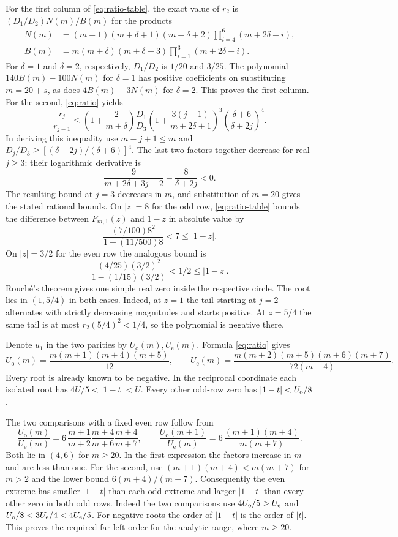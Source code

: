 \documentclass[11pt]{article}
\begin{document}
For the first column of \eqref{eq:ratio-table}, the exact value of $r_2$ is $(D_1/D_2)N(m)/B(m)$ for the products
\[
\begin{aligned}
N(m)&=(m-1)(m+\delta+1)(m+\delta+2)
                \prod_{i=4}^6(m+2\delta+i),\\
B(m)&=m(m+\delta)(m+\delta+3)\prod_{i=1}^3(m+2\delta+i).
\end{aligned}
\]
For $\delta=1$ and $\delta=2$, respectively, $D_1/D_2$ is $1/20$ and $3/25$. The polynomial $140B(m)-100N(m)$ for $\delta=1$ has positive coefficients on substituting $m=20+s$, as does $4B(m)-3N(m)$ for $\delta=2$. This proves the first column. For the second, \eqref{eq:ratio} yields
\[
\frac{r_j}{r_{j-1}}\le
  \left(1+\frac2{m+\delta}\right)\frac{D_1}{D_3}
  \left(1+\frac{3(j-1)}{m+2\delta+1}\right)^3
  \left(\frac{\delta+6}{\delta+2j}\right)^4.
\]
In deriving this inequality use $m-j+1\le m$ and $D_j/D_3\ge[(\delta+2j)/(\delta+6)]^4$. The last two factors together decrease for real $j\ge3$: their logarithmic derivative is
\[
\frac9{m+2\delta+3j-2}-\frac8{\delta+2j}<0.
\]
The resulting bound at $j=3$ decreases in $m$, and substitution of $m=20$ gives the stated rational bounds.
On $|z|=8$ for the odd row, \eqref{eq:ratio-table} bounds the difference between $F_{m,1}(z)$ and $1-z$ in absolute value by
\[
\frac{(7/100)8^2}{1-(11/500)8}<7\le |1-z|.
\]
On $|z|=3/2$ for the even row the analogous bound is
\[
\frac{(4/25)(3/2)^2}{1-(1/15)(3/2)}<1/2\le |1-z|.
\]
Rouché's theorem gives one simple real zero inside the respective circle. The root lies in $(1,5/4)$ in both cases. Indeed, at $z=1$ the tail starting at $j=2$ alternates with strictly decreasing magnitudes and starts positive. At $z=5/4$ the same tail is at most $r_2(5/4)^2<1/4$, so the polynomial is negative there.

Denote $u_1$ in the two parities by $U_{\mathrm o}(m),U_{\mathrm e}(m)$. Formula \eqref{eq:ratio} gives
\[
U_{\mathrm o}(m)=\frac{m(m+1)(m+4)(m+5)}{12},\qquad
U_{\mathrm e}(m)=\frac{m(m+2)(m+5)(m+6)(m+7)}{72(m+4)}.
\]
Every root is already known to be negative. In the reciprocal coordinate each isolated root has \(4U/5<|1-t|<U\). Every other odd-row zero has \(|1-t|<U_{\rm o}/8\).

The two comparisons with a fixed even row follow from
\[
\frac{U_{\mathrm o}(m)}{U_{\mathrm e}(m)}
 =6\,\frac{m+1}{m+2}\frac{m+4}{m+6}\frac{m+4}{m+7},
\qquad
\frac{U_{\mathrm o}(m+1)}{U_{\mathrm e}(m)}
 =6\,\frac{(m+1)(m+4)}{m(m+7)}.
\]
Both lie in $(4,6)$ for $m\ge20$. In the first expression the factors increase in $m$ and are less than one. For the second, use $(m+1)(m+4)<m(m+7)$ for $m>2$ and the lower bound $6(m+4)/(m+7)$.
Consequently the even extreme has smaller \(|1-t|\) than each odd extreme and larger \(|1-t|\) than every other zero in both odd rows. Indeed the two comparisons use \(4U_{\rm o}/5>U_{\rm e}\) and \(U_{\rm o}/8<3U_{\rm e}/4<4U_{\rm e}/5\). For negative roots the order of \(|1-t|\) is the order of \(|t|\). This proves the required far-left order for the analytic range, where \(m\ge20\).
\end{document}
